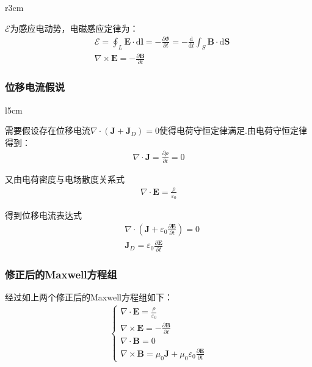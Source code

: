 \documentclass[main.tex]{subfiles}
\begin{document}
\begin{wrapfigure}{r}{3cm}
	\centering
	
\end{wrapfigure}

$\mathcal{E}$为感应电动势，电磁感应定律为：
\begin{align}
    &\mathcal{E} = \oint_{L}^{}\boldsymbol{E} \cdot \mathrm{d}\boldsymbol{l} =-\frac{\partial \Phi }{\partial t}  =-\frac{\mathrm{d} }{\mathrm{d} t } \int_{S}^{}\boldsymbol{B}\cdot \mathrm{d}\boldsymbol{S}\\
    &\nabla \times \boldsymbol{E} = -\frac{\partial \boldsymbol{B}}{\partial t}
\end{align}

\subsubsection{位移电流假说}
\begin{wrapfigure}{l}{5cm}
	\centering	
\end{wrapfigure}
需要假设存在位移电流$\nabla \cdot (\boldsymbol{J}+\boldsymbol{J}_D) = 0$使得电荷守恒定律满足.由电荷守恒定律得到：
\begin{align}
    \nabla \cdot \boldsymbol{J} = \frac{\partial \rho}{\partial t} = 0
\end{align}

又由电荷密度与电场散度关系式
\begin{align}
    \nabla \cdot \boldsymbol{E} = \frac{\rho}{\varepsilon _0}
\end{align}

得到位移电流表达式
\begin{align}
    &\nabla \cdot \left(\boldsymbol{J}+ \varepsilon _0 \frac{\partial \boldsymbol{E}}{\partial t}\right) = 0\\
    &\boldsymbol{J}_D = \varepsilon _0\frac{\partial \boldsymbol{E}}{\partial t}
\end{align}

\subsubsection{修正后的Maxwell方程组}
经过如上两个修正后的Maxwell方程组如下：
\begin{align}
\label{Maxwell}\left\{\begin{array}{l}
 \nabla \cdot \boldsymbol{E} = \frac{\rho}{\varepsilon _0}\\
 \nabla \times \boldsymbol{E} = -\frac{\partial \boldsymbol{B}}{\partial t}\\
\nabla \cdot  \boldsymbol{B} = 0\\
\nabla \times \boldsymbol{B} = \mu _0 \boldsymbol{J}+\mu _0 \varepsilon _0\frac{\partial \boldsymbol{E}}{\partial t}
\end{array}\right.
\end{align}
\end{document}
